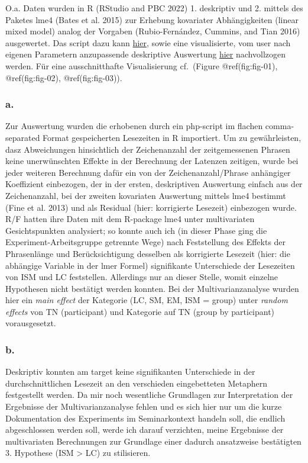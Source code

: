 \documentclass[
]{article}
\begin{document}
O.a. Daten wurden in R (RStudio and PBC 2022) 1. deskriptiv und 2. mittels des Paketes lme4 (Bates et al. 2015) zur Erhebung kovariater Abhängigkeiten (linear mixed model) analog der Vorgaben (Rubio-Fernández, Cummins, and Tian 2016) ausgewertet. Das script dazu kann \href{https://github.com/esteeschwarz/essais/tree/main/docs/hux2021/evaluation}{hier}, sowie eine visualisierte, vom user nach eigenen Parametern anzupassende deskriptive Auswertung \href{https://vision2020.shinyapps.io/hux2021}{hier} nachvollzogen werden. Für eine ausschnitthafte Visualisierung cf.~(Figure @ref(fig:fig-01), @ref(fig:fig-02), @ref(fig:fig-03)).

\hypertarget{a.}{%
\subsubsection{a.}\label{a.}}

Zur Auswertung wurden die erhobenen durch ein php-script im flachen comma-separated Format gespeicherten Lesezeiten in R importiert. Um zu gewährleisten, dasz Abweichungen hinsichtlich der Zeichenanzahl der zeitgemessenen Phrasen keine unerwünschten Effekte in der Berechnung der Latenzen zeitigen, wurde bei jeder weiteren Berechnung dafür ein von der Zeichenanzahl/Phrase anhängiger Koeffizient einbezogen, der in der ersten, deskriptiven Auswertung einfach aus der Zeichenanzahl, bei der zweiten kovariaten Auswertung mittels lme4 bestimmt (Fine et al. 2013) und als Residual (hier: korrigierte Lesezeit) einbezogen wurde. R/F hatten ihre Daten mit dem R-package lme4 unter multivariaten Gesichtspunkten analysiert; so konnte auch ich (in dieser Phase ging die Experiment-Arbeitsgruppe getrennte Wege) nach Feststellung des Effekts der Phrasenlänge und Berücksichtigung desselben als korrigierte Lesezeit (hier: die abhängige Variable in der lmer Formel) signifikante Unterschiede der Lesezeiten von ISM und LC feststellen. Allerdings nur an dieser Stelle, womit einzelne Hypothesen nicht bestätigt werden konnten. Bei der Multivarianzanalyse wurden hier ein \emph{main effect} der Kategorie (LC, SM, EM, ISM = group) unter \emph{random effects} von TN (participant) und Kategorie auf TN (group by participant) vorausgesetzt.

\hypertarget{b.}{%
\subsubsection{b.}\label{b.}}

Deskriptiv konnten am target keine signifikanten Unterschiede in der durchschnittlichen Lesezeit an den verschieden eingebetteten Metaphern festgestellt werden. Da mir noch wesentliche Grundlagen zur Interpretation der Ergebnisse der Multivarianzanalyse fehlen und es sich hier nur um die kurze Dokumentation des Experiments im Seminarkontext handeln soll, die endlich abgeschlossen werden soll, werde ich darauf verzichten, meine Ergebnisse der multivariaten Berechnungen zur Grundlage einer dadurch ansatzweise bestätigten 3. Hypothese (ISM \textgreater{} LC) zu stilisieren.
\end{document}
